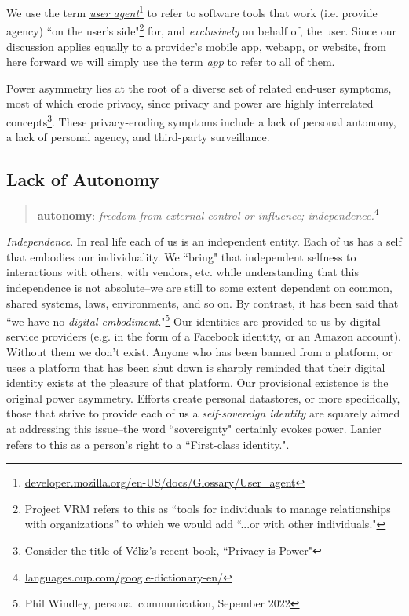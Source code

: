 \documentclass[11pt, oneside]{article}   	%
\newcommand{\hyperfootnote}[1][]{\def\ArgI{{#1}}\hyperfootnoteRelay}
\newcommand\hyperfootnoteRelay[2][]{\href{#1#2}{\ArgI}\footnote{\href{#1#2}{#2}}}
\begin{document}
We use the term \hyperfootnote[\emph{user agent}][https://]{developer.mozilla.org/en-US/docs/Glossary/User\_agent} to refer to software tools that work (i.e. provide agency) ``on the user's side"\footnote{Project VRM refers to this as ``tools for individuals to manage relationships with organizations'' to which we would add ``...or with other individuals."} for, and \emph{exclusively} on behalf of, the user. Since our discussion applies equally to a provider's mobile app, webapp, or website, from here forward we will simply use the term \emph{app} to refer to all of them.

Power asymmetry lies at the root of a diverse set of related end-user symptoms, most of which erode privacy, since privacy and power are highly interrelated concepts\footnote{Consider the title of V\'eliz's recent book, ``Privacy is Power"\cite{veliz2020}}. 
These privacy-eroding symptoms include a lack of personal autonomy, a lack of personal agency, and third-party surveillance. 

\subsection{Lack of Autonomy}

\begin{quote}
	\textbf{autonomy}: \emph{freedom from external control or influence; independence.}\hyperfootnote[][https://]{languages.oup.com/google-dictionary-en/}
\end{quote}

\emph{Independence}. In real life each of us is an independent entity. Each of us has a self that embodies our individuality. We ``bring" that independent selfness to interactions with others, with vendors, etc. while understanding that this independence is not absolute--we are still to some extent dependent on common, shared systems, laws, environments, and so on. By contrast, it has been said that ``we have no \emph{digital embodiment}."\footnote{Phil Windley, personal communication, Sepember 2022}  Our identities are provided to us by digital service providers (e.g. in the form of a Facebook identity, or an Amazon account). Without them we don't exist. Anyone who has been banned from a platform, or uses a platform that has been shut down is sharply reminded that their digital identity exists at the pleasure of that platform. Our provisional existence is the original power asymmetry. Efforts create personal datastores, or more specifically, those that strive to provide each of us a \emph{self-sovereign identity}\cite{Preukschat2021} are squarely aimed at addressing this issue--the word ``sovereignty" certainly evokes power. Lanier refers to this as a person's right to a ``First-class identity."\cite[p251]{Lanier2014}.
\end{document}
